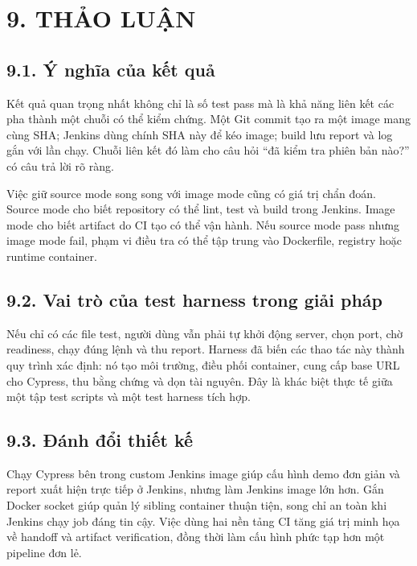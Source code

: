 \documentclass[
  vietnamese,
  12pt,
  a4paper,
  oneside]{report}
\begin{document}
\chapter{9. THẢO LUẬN}\label{9-thux1ea3o-luux1eadn}

\section{9.1. Ý nghĩa của kết
quả}\label{91-uxfd-nghux129a-cux1ee7a-kux1ebft-quux1ea3}

Kết quả quan trọng nhất không chỉ là số test pass mà là khả năng liên
kết các pha thành một chuỗi có thể kiểm chứng. Một Git commit tạo ra một
image mang cùng SHA; Jenkins dùng chính SHA này để kéo image; build lưu
report và log gắn với lần chạy. Chuỗi liên kết đó làm cho câu hỏi ``đã
kiểm tra phiên bản nào?'' có câu trả lời rõ ràng.

Việc giữ source mode song song với image mode cũng có giá trị chẩn đoán.
Source mode cho biết repository có thể lint, test và build trong
Jenkins. Image mode cho biết artifact do CI tạo có thể vận hành. Nếu
source mode pass nhưng image mode fail, phạm vi điều tra có thể tập
trung vào Dockerfile, registry hoặc runtime container.

\section{9.2. Vai trò của test harness trong giải
pháp}\label{92-vai-truxf2-cux1ee7a-test-harness-trong-giux1ea3i-phuxe1p}

Nếu chỉ có các file test, người dùng vẫn phải tự khởi động server, chọn
port, chờ readiness, chạy đúng lệnh và thu report. Harness đã biến các
thao tác này thành quy trình xác định: nó tạo môi trường, điều phối
container, cung cấp base URL cho Cypress, thu bằng chứng và dọn tài
nguyên. Đây là khác biệt thực tế giữa một tập test scripts và một test
harness tích hợp.

\section{9.3. Đánh đổi thiết
kế}\label{93-ux111uxe1nh-ux111ux1ed5i-thiux1ebft-kux1ebf}

Chạy Cypress bên trong custom Jenkins image giúp cấu hình demo đơn giản
và report xuất hiện trực tiếp ở Jenkins, nhưng làm Jenkins image lớn
hơn. Gắn Docker socket giúp quản lý sibling container thuận tiện, song
chỉ an toàn khi Jenkins chạy job đáng tin cậy. Việc dùng hai nền tảng CI
tăng giá trị minh họa về handoff và artifact verification, đồng thời làm
cấu hình phức tạp hơn một pipeline đơn lẻ.
\end{document}
